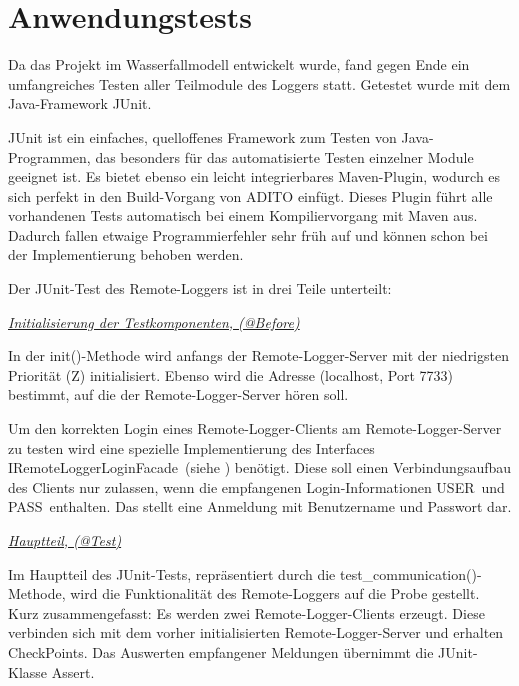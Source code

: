 \section{Anwendungstests}
\par Da das Projekt im Wasserfallmodell entwickelt wurde, fand gegen Ende ein umfangreiches Testen aller Teilmodule des Loggers statt. Getestet wurde mit dem Java-Framework \glqq JUnit\grqq.
\par JUnit ist ein einfaches, quelloffenes Framework zum Testen von Java-Programmen, das besonders für das automatisierte Testen einzelner Module geeignet ist. Es bietet ebenso ein leicht integrierbares Maven-Plugin, wodurch es sich perfekt in den Build-Vorgang von ADITO einfügt. Dieses Plugin führt alle vorhandenen Tests automatisch bei einem Kompiliervorgang mit Maven aus. Dadurch fallen etwaige Programmierfehler sehr früh auf und können schon bei der Implementierung behoben werden.
\par Der JUnit-Test des Remote-Loggers ist in drei Teile unterteilt:

\par \textit{\underline{Initialisierung der Testkomponenten, (@Before)}}
\vspace{8px}

In der \glqq init()\grqq-Methode wird anfangs der Remote-Logger-Server mit der niedrigsten Priorität (Z) initialisiert. Ebenso wird die Adresse (localhost, Port 7733) bestimmt, auf die der Remote-Logger-Server hören soll.

\vspace{10px}

Um den korrekten Login eines Remote-Logger-Clients am Remote-Logger-Server zu testen wird eine spezielle Implementierung des Interfaces \glqq IRemoteLoggerLoginFacade\grqq\ (siehe ) benötigt. Diese soll einen Verbindungsaufbau des Clients nur zulassen, wenn die empfangenen Login-Informationen \glqq USER\grqq\ und \glqq PASS\grqq\ enthalten. Das stellt eine Anmeldung mit Benutzername und Passwort dar.

\vspace{5px}
\par \textit{\underline{Hauptteil, (@Test)}}
\par Im Hauptteil des JUnit-Tests, repräsentiert durch die \glqq test\_communication()\grqq-Methode, wird die Funktionalität des Remote-Loggers auf die Probe gestellt. \\
Kurz zusammengefasst: Es werden zwei Remote-Logger-Clients erzeugt. Diese verbinden sich mit dem vorher initialisierten Remote-Logger-Server und erhalten CheckPoints. Das Auswerten empfangener Meldungen übernimmt die JUnit-Klasse \glqq Assert\grqq. 

